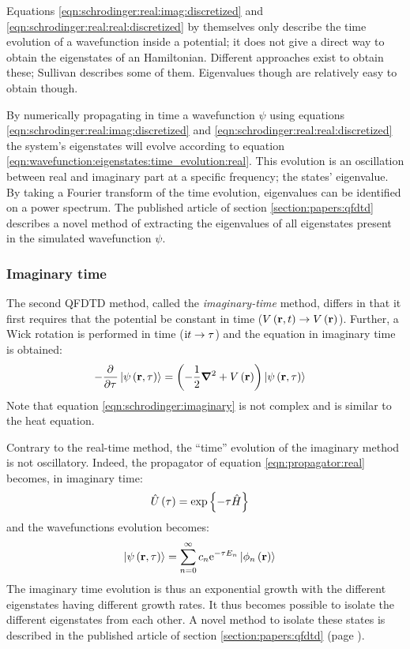 Equations \eqref{eqn:schrodinger:real:imag:discretized} and
\eqref{eqn:schrodinger:real:real:discretized} by themselves only describe the
time evolution of a wavefunction inside a potential; it does not give a direct
way to obtain the eigenstates of an Hamiltonian. Different approaches exist to
obtain these; Sullivan describes some of them. Eigenvalues though are
relatively easy to obtain though.

By numerically propagating in time a wavefunction $\psi$ using equations
\eqref{eqn:schrodinger:real:imag:discretized} and
\eqref{eqn:schrodinger:real:real:discretized} the system's eigenstates will
evolve according to equation
\eqref{eqn:wavefunction:eigenstates:time_evolution:real}. This evolution is an
oscillation between real and imaginary part at a specific frequency; the states'
eigenvalue. By taking a Fourier transform of the time evolution, eigenvalues
can be identified on a power spectrum. The published article of section
\ref{section:papers:qfdtd} describes a novel method of extracting the
eigenvalues of all eigenstates present in the simulated wavefunction $\psi$.



\subsubsection{Imaginary time}

The second QFDTD method, called the \textit{imaginary-time} method, differs in
that it first requires that the potential be constant in time ($V\left( \textbf{r}, t \right)
\rightarrow V\left( \textbf{r} \right)$). Further, a Wick rotation is performed in time ($\textrm{i} t
\rightarrow \tau$) and the \schrodinger equation in imaginary time is
obtained:
\begin{align}
- \frac{\partial^{{}} }{\partial {\tau}^{{}}} \left| \psi\left( \textbf{r}, \tau \right) \right>
    & = \left( -\frac{1}{2} \bm{\nabla}^2 + V\left( \textbf{r} \right)  \right) \left| \psi\left( \textbf{r}, \tau \right) \right>
\label{eqn:schrodinger:imaginary}
\end{align}
Note that equation \eqref{eqn:schrodinger:imaginary} is not complex and is
similar to the heat equation.


Contrary to the real-time method, the ``time'' evolution of the imaginary
method is not oscillatory. Indeed, the propagator of equation
\eqref{eqn:propagator:real} becomes, in imaginary time:
\begin{align}
\hat{U}\left( \tau \right) & = \exp{ \left\{  - \tau  \hat{H} \right\}} \label{eqn:propagator:imag}
\end{align}
and the wavefunctions evolution becomes:
\begin{align}
\left| \psi\left( \textbf{r}, \tau \right) \right>
 & = \sum_{n=0}^{\infty} c_n \textrm{e}^{ - \tau E_n } \left| \phi_n\left( \textbf{r} \right) \right>
\end{align}
The imaginary time evolution is thus an exponential growth with the different
eigenstates having different growth rates. It thus becomes possible to isolate
the different eigenstates from each other. A novel method to isolate these
states is described in the published article of section
\ref{section:papers:qfdtd} (page \pageref{section:papers:qfdtd}).

